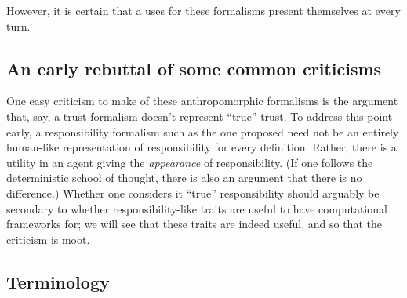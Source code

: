 However, it is certain that a uses for these formalisms present themselves at every turn.\par

\subsection{An early rebuttal of some common criticisms}

One easy criticism to make of these anthropomorphic formalisms is the argument that, say, a trust formalism doesn't represent ``true'' trust. To address this point early, a responsibility formalism such as the one proposed need not be an entirely human-like representation of responsibility for every definition. Rather, there is a utility in an agent giving the \emph{appearance} of responsibility. (If one follows the deterministic school of thought, there is also an argument that there is no difference\cite{determinism_in_brief}.) Whether one considers it ``true'' responsibility should arguably be secondary to whether responsibility-like traits are useful to have computational frameworks for; we will see that these traits are indeed useful, and so that the criticism is moot.\par

\subsection{Terminology}\label{subsec:terminology}
